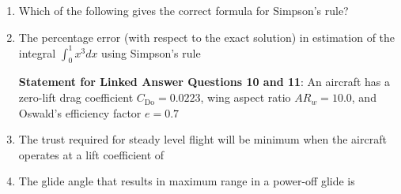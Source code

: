 \documentclass[journal,12pt,onecolumn]{IEEEtran}
\theoremstyle{remark}
\begin{document}
\begin{enumerate}
\item Which of the following gives the correct formula for Simpson's rule?
\begin{enumerate}
\end{enumerate}
\item The percentage error (with respect to the exact solution) in estimation of the integral $\int_{0}^{1} x^{3} dx$ using Simpson's rule 
\begin{enumerate}
\end{enumerate}

\textbf{Statement for Linked Answer Questions 10 and 11}: An aircraft has a zero-lift drag coefficient $C_{\text{Do}} = 0.0223$, wing aspect ratio $AR_{w} = 10.0 $, and Oswald's efficiency factor $e = 0.7$
\item The trust required for steady level flight will be minimum when the aircraft operates at a lift coefficient of 
\begin{enumerate}
\end{enumerate}
 \item The glide angle that results in maximum range in a power-off glide is
\begin{enumerate}
\end{enumerate}


\end{enumerate}
\end{document}

